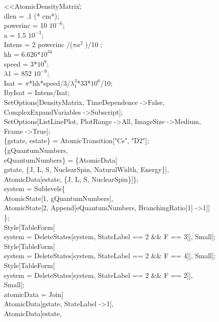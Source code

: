 \begin{enumerate}
\textless\textless AtomicDensityMatrix\`;\\
dlen = .1 (* cm*);\\
powerinc = 10 $10^{-6}$;\\
a = 1.5 $10^{-3}$;\\
Intens = 2 powerinc /($\pi a^2$ )/10 ;\\
hh = 6.626*$10^{34}$\\
speed = 3*$10^{8}$;\\
$\lambda$1 = 852 $10^{-9}$;\\
Isat = $\pi$*hh*speed/3/$\lambda_1^3$*33*$10^{6}$/10;\\
IbyIsat = Intens/Isat;\\
SetOptions[DensityMatrix, TimeDependence -\textgreater False, \\
  ComplexExpandVariables -\textgreater Subscript];\\
SetOptions[ListLinePlot, PlotRange -\textgreater All, ImageSize -\textgreater Medium, \\
  Frame -\textgreater True];\\
\{gstate, estate\} = AtomicTransition["Cs", "D2"];\\
\{gQuantumNumbers, \\
   eQuantumNumbers\} = \{AtomicData[\\
    gstate, \{J, L, S, NuclearSpin, NaturalWidth, Energy\}],\\
   AtomicData[estate, \{J, L, S, NuclearSpin\}]\};\\
system = Sublevels\@\{\\
    AtomicState[1, gQuantumNumbers], \\
    AtomicState[2, Append[eQuantumNumbers, BranchingRatio[1] -\textgreater 1]]\\
    \};\\
Style[TableForm[\\
   system = DeleteStates[system, StateLabel == 2 \&\& F == 3]], Small];\\
Style[TableForm[\\
   system = DeleteStates[system, StateLabel == 2 \&\& F == 4]], Small];\\
Style[TableForm[\\
   system = DeleteStates[system, StateLabel == 2 \&\& F == 2]],\\
  Small];\\
atomicData = Join[\\
   AtomicData[gstate, StateLabel -\textgreater 1],\\
   AtomicData[estate, \\

\end{enumerate}
